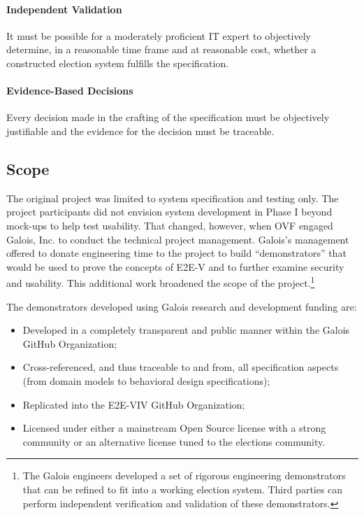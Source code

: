 \paragraph{Independent Validation}
It must be possible for a moderately proficient IT expert to
objectively determine, in a reasonable time frame and at reasonable
cost, whether a constructed election system fulfills the
specification.

\paragraph{Evidence-Based Decisions}
Every decision made in the crafting of the specification must be
objectively justifiable and the evidence for the decision must be
traceable.

\subsection*{Scope}
\label{sec:scope}

The original project was limited to system specification and testing
only. The project participants did not envision system development in
Phase I beyond mock-ups to help test usability. That changed, however,
when OVF engaged Galois, Inc. to conduct the technical project
management. Galois’s management offered to donate engineering time to
the project to build ``demonstrators'' that would be used to prove the
concepts of E2E-V and to further examine security and usability. This
additional work broadened the scope of the project.\footnote{The
  Galois engineers developed a set of rigorous engineering
  demonstrators that can be refined to fit into a working election
  system. Third parties can perform independent verification and
  validation of these demonstrators.}

The demonstrators developed using Galois research and development
funding are:

\begin{itemize}
\item Developed in a completely transparent and public manner within
  the Galois GitHub Organization;
\item Cross-referenced, and thus traceable to and from, all
  specification aspects (from domain models to behavioral design
  specifications);
\item Replicated into the E2E-VIV GitHub Organization;
\item Licensed under either a mainstream Open Source license with a
  strong community or an alternative license tuned to the elections
  community.
\end{itemize}

